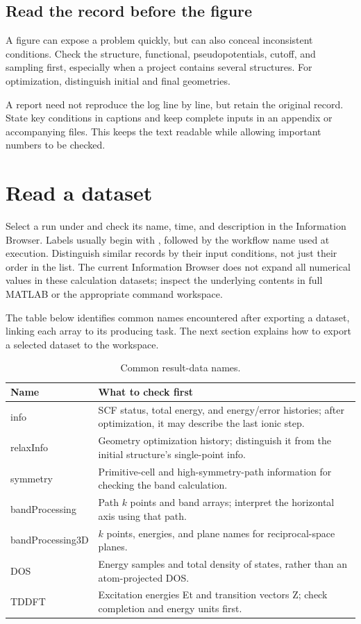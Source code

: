 \subsection{Read the record before the figure}

A figure can expose a problem quickly, but can also conceal inconsistent conditions. Check the structure, functional, pseudopotentials, cutoff, and sampling first, especially when a project contains several structures. For optimization, distinguish initial and final geometries.

A report need not reproduce the log line by line, but retain the original record. State key conditions in captions and keep complete inputs in an appendix or accompanying files. This keeps the text readable while allowing important numbers to be checked.

\section{Read a dataset}\label{sec:read-dataset}

Select a run under  and check its name, time, and description in the Information Browser. Labels usually begin with , followed by the workflow name used at execution. Distinguish similar records by their input conditions, not just their order in the list. The current Information Browser does not expand all numerical values in these calculation datasets; inspect the underlying contents in full MATLAB\regmark{} or the appropriate command workspace.

The table below identifies common names encountered after exporting a dataset, linking each array to its producing task. The next section explains how to export a selected dataset to the workspace.

\begin{table}[htbp]
\centering
\caption{Common result-data names.}
\begin{tabularx}{\linewidth}{lX}
\toprule
Name & What to check first \\
\midrule
info & SCF status, total energy, and energy/error histories; after optimization, it may describe the last ionic step. \\
relaxInfo & Geometry optimization history; distinguish it from the initial structure's single-point info. \\
symmetry & Primitive-cell and high-symmetry-path information for checking the band calculation. \\
bandProcessing & Path $k$ points and band arrays; interpret the horizontal axis using that path. \\
bandProcessing3D & $k$ points, energies, and plane names for reciprocal-space planes. \\
DOS & Energy samples and total density of states, rather than an atom-projected DOS. \\
TDDFT & Excitation energies Et and transition vectors Z; check completion and energy units first. \\
\bottomrule
\end{tabularx}
\end{table}


